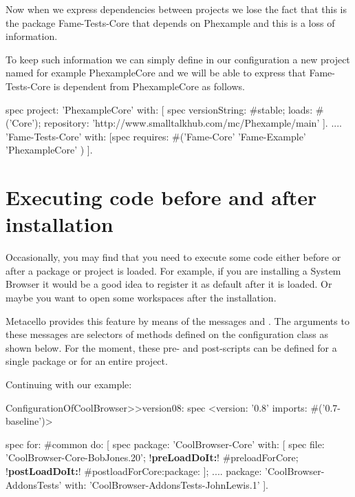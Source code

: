 \documentclass[a4paper,10pt,twoside]{book}
\begin{document}
Now when we express dependencies between projects we lose the fact that this is the package Fame-Tests-Core that depends on Phexample and this is a loss of information.

To keep such information we can simply define in our configuration a new project named for example PhexampleCore and we will be able to express that Fame-Tests-Core is dependent from PhexampleCore as follows.


\begin{code}{}
spec
	project: 'PhexampleCore'
	with: [ spec
               versionString: #stable;
               loads: #('Core');
               repository: 'http://www.smalltalkhub.com/mc/Phexample/main' ].
	....
	'Fame-Tests-Core' with: [spec requires: #('Fame-Core' 'Fame-Example' 'PhexampleCore' ) ].
\end{code}


\section{Executing code before and after installation}
Occasionally, you may find that you need to execute some code either before or after a package or project is loaded. For example, if you are installing a System Browser it would be a good idea to register it as default after it is loaded. Or maybe you want to open some workspaces after the installation.

Metacello provides this feature by means of the messages  and .  The arguments to these messages are selectors of methods defined on the configuration class as shown below. For the moment, these pre- and post-scripts can be defined for a single package or for an entire project.

Continuing with our example:

\begin{code}{}
ConfigurationOfCoolBrowser>>version08: spec
       <version: '0.8' imports: #('0.7-baseline')>

       spec for: #common do: [
              spec
                     package: 'CoolBrowser-Core' with: [
                            spec
                                   file: 'CoolBrowser-Core-BobJones.20';
                                   !\textbf{preLoadDoIt:}! #preloadForCore;
                                   !\textbf{postLoadDoIt:}! #postloadForCore:package: ];
                     ....
                     package: 'CoolBrowser-AddonsTests' with: 'CoolBrowser-AddonsTests-JohnLewis.1' ].
\end{code}
\end{document}

